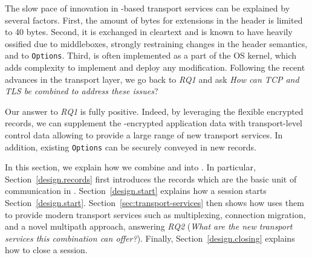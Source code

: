 


The slow pace of innovation in \tcp-based transport services can be explained by
several factors. First, the amount of bytes for extensions in the \tcp header is
limited to 40 bytes. Second, it is exchanged in cleartext and is known to have
heavily ossified due to middleboxes, strongly restraining changes in the header
semantics, and to \tcp \texttt{Options}. Third, \tcp is often implemented as a 
part of the OS kernel, which adds complexity to implement and deploy any 
modification.
Following the recent advances in the transport layer, we go back to
{\small{\textit{RQ1}}} and ask \textit{How can TCP and TLS be combined to address these issues}?

Our answer to {\small{\textit{RQ1}}} is fully positive. Indeed, by leveraging the flexible encrypted \tls records, we can supplement the \tls-encrypted application data with transport-level control data allowing \tcpls to provide a large range of new transport services. In addition, existing \tcp \texttt{Options} can be securely conveyed in new \tls records. %


In this section, we explain how we combine \tcp and \tls into \tcpls. In 
particular, Section~\ref{design.records} first introduces the \tcpls records 
which are the basic unit of 
communication in \tcpls. Section~\ref{design.start} explains how a 
\tcpls session starts Section~\ref{design.start}. 
Section~\ref{sec:transport-services} then shows
how \tcpls uses them to provide modern transport services such as 
multiplexing, connection migration, and a novel multipath approach, answering 
{\small{\textit{RQ2}}} 
(\textit{What are the new transport services this 
combination can offer?}).  Finally, Section~\ref{design.closing} explains how 
to close a \tcpls session.


